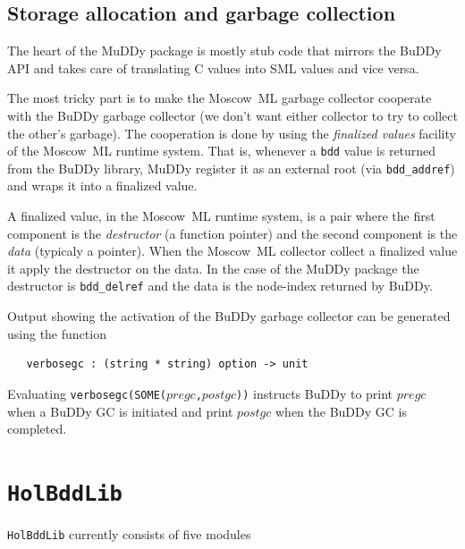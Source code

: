 \documentclass[12pt,fleqn]{article}
\renewcommand{\t}[1]{\mbox{\tt #1}}
\newcommand{\mosml}{Moscow~ML{}}
\newcommand{\Buddy}{BuDDy{}}
\newcommand{\Muddy}{MuDDy{}}
\begin{document}
\subsection{Storage allocation and garbage collection}
\label{sec:technical-details}

The heart of the \Muddy{} package is mostly stub code that mirrors the
\Buddy{} API and takes care of translating C values into SML values and
vice versa.

The most tricky part is to make the \mosml{} garbage collector cooperate
with the \Buddy{} garbage collector (we don't want either collector to
try to collect the other's garbage).  The cooperation is done by using
the \emph{finalized values} facility of the \mosml{} runtime system.
That is, whenever a \texttt{bdd} value is returned from the \Buddy{}
library, \Muddy{} register it as an external root (via
\verb+bdd_addref+) and wraps it into a finalized value.

A finalized value, in the \mosml{} runtime system, is a pair where the
first component is the \emph{destructor} (a function pointer) and the
second component is the \emph{data} (typicaly a pointer).  When the
\mosml{} collector collect a finalized value it apply the destructor on
the data.  In the case of the \Muddy{} package the destructor is
\verb+bdd_delref+ and the data is the node-index returned by \Buddy{}.

Output showing the activation of the \Buddy{} garbage collector can be generated
using the function

\begin{verbatim}
   verbosegc : (string * string) option -> unit
\end{verbatim}

Evaluating \t{verbosegc(SOME($pregc$,$postgc$))} instructs BuDDy to print
$pregc$ when a BuDDy GC is initiated and print $postgc$ when the
\Buddy{} GC is completed.

\section{\t{HolBddLib}}\label{HolBddLib}

\t{HolBddLib} currently consists of five modules
\end{document}
